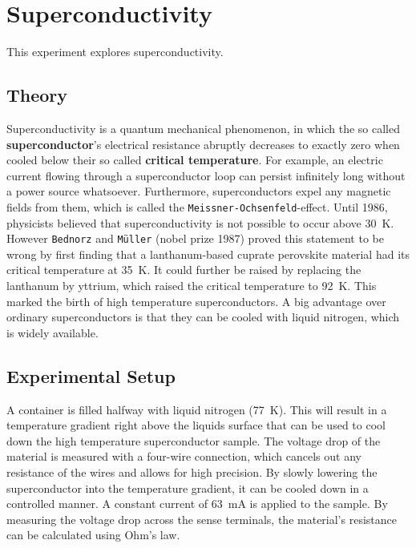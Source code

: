 \chapter{Superconductivity}
This experiment explores superconductivity.

\section{Theory}
Superconductivity is a quantum mechanical phenomenon, in which the so called \textbf{superconductor}'s electrical resistance abruptly decreases to exactly zero when cooled below their so called \textbf{critical temperature}.
For example, an electric current flowing through a superconductor loop can persist infinitely long without a power source whatsoever.
Furthermore, superconductors expel any magnetic fields from them, which is called the \texttt{Meissner-Ochsenfeld}-effect.
Until 1986, physicists believed that superconductivity is not possible to occur above \SI{30}{\kelvin}.
However \texttt{Bednorz} and \texttt{Müller} (nobel prize 1987) proved this statement to be wrong by first finding that a lanthanum-based cuprate perovskite material had its critical temperature at \SI{35}{\kelvin}.
It could further be raised by replacing the lanthanum by yttrium, which raised the critical temperature to \SI{92}{\kelvin}\cite{PhysRevLett.58.908}.
This marked the birth of high temperature superconductors.
A big advantage over ordinary superconductors is that they can be cooled with liquid nitrogen, which is widely available.

\section{Experimental Setup}
A container is filled halfway with liquid nitrogen (\SI{77}{\kelvin}).
This will result in a temperature gradient right above the liquids surface that can be used to cool down the high temperature superconductor sample.
The voltage drop of the material is measured with a four-wire connection, which cancels out any resistance of the wires and allows for high precision.
By slowly lowering the superconductor into the temperature gradient, it can be cooled down in a controlled manner.
A constant current of \SI{63}{\mA} is applied to the sample.
By measuring the voltage drop across the sense terminals, the material's resistance can be calculated using Ohm's law.

